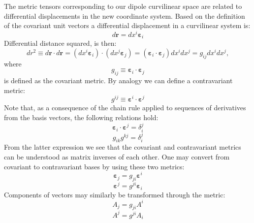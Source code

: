\documentclass[11pt,letterpaper]{article}
\begin{document}
The metric tensors corresponding to our dipole curvilinear space are related to differential displacements in the new coordinate system.  Based on the definition of the covariant unit vectors a differential displacement in a curvilinear system is:
\begin{equation}
d \mathbf{r} = d x^i \boldsymbol{\varepsilon}_i \label{eqn:dr}
\end{equation}
Differential distance squared, is then:
\begin{equation}
dr^2 \equiv d \mathbf{r} \cdot d \mathbf{r} = \left(d x^i \boldsymbol{\varepsilon}_i \right) \cdot \left( d x^j \boldsymbol{\varepsilon}_j \right) = \left( \boldsymbol{\varepsilon}_i \cdot \boldsymbol{\varepsilon}_j \right) dx^i dx^j = g_{ij} dx^i dx^j,
\end{equation}
where
\begin{equation}
g_{ij} \equiv \boldsymbol{\varepsilon}_i \cdot \boldsymbol{\varepsilon}_j
\end{equation}
is defined as the covariant metric.  By analogy we can define a contravariant metric:
\begin{equation}
g^{ij} \equiv \boldsymbol{\varepsilon}^i \cdot \boldsymbol{\varepsilon}^j
\end{equation}
Note that, as a consequence of the chain rule applied to sequences of derivatives from the basis vectors, the following relations hold:
\begin{equation}
\boldsymbol{\varepsilon}_i \cdot \boldsymbol{\varepsilon}^j = \delta_i^j
\end{equation}
\begin{equation}
g_{ik} g^{kj} = \delta_i^j
\end{equation}
From the latter expression we see that the covariant and contravariant metrics can be understood as matrix inverses of each other.  One may convert from covariant to contravariant bases by using these two metrics:
\begin{equation}
\boldsymbol{\varepsilon}_j = g_{ji} \boldsymbol{\varepsilon}^i
\end{equation}
\begin{equation}
\boldsymbol{\varepsilon}^j = g^{ji} \boldsymbol{\varepsilon}_i
\end{equation}
Components of vectors may similarly be transformed through the metric:
\begin{equation}
A_j = g_{ji} A^i
\end{equation}
\begin{equation}
A^j = g^{ji} A_i
\end{equation}
\end{document}
